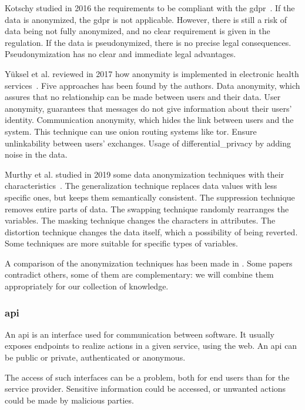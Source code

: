 Kotschy studied in 2016 the requirements to be compliant with the \gls{gdpr}~\cite{kotschy_new_2016}. If the data is anonymized, the \gls{gdpr} is not applicable. However, there is still a risk of data being not fully anonymized, and no clear requirement is given in the regulation. If the data is pseudonymized, there is no precise legal consequences. Pseudonymization has no clear and immediate legal advantages. %

Yüksel et al. reviewed in 2017 how anonymity is implemented in electronic health services~\cite{yuksel_research_2017}. Five approaches has been found by the authors. Data anonymity, which assures that no relationship can be made between users and their data. User anonymity, guarantees that messages do not give information about their users' identity. Communication anonymity, which hides the link between users and the system. This technique can use onion routing systems like \gls{tor}. Ensure unlinkability between users' exchanges. Usage of \gls{differential_privacy} by adding noise in the data. %

Murthy et al. studied in 2019 some data anonymization techniques with their characteristics~\cite{murthy_comparative_2019}. The generalization technique replaces data values with less specific ones, but keeps them semantically consistent. The suppression technique removes entire parts of data. The swapping technique randomly rearranges the variables. The masking technique changes the characters in attributes. The distortion technique changes the data itself, which a possibility of being reverted. Some techniques are more suitable for specific types of variables. %

A comparison of the anonymization techniques has been made in . Some papers contradict others, some of them are complementary: we will combine them appropriately for our collection of knowledge.

\subsubsection{\acrlong*{api}}
\label{subsubsec:state_review_results_api}

An \gls{api} is an interface used for communication between software. It usually exposes endpoints to realize actions in a given service, using the web. An \gls{api} can be public or private, authenticated or anonymous.

The access of such interfaces can be a problem, both for end users than for the service provider. Sensitive information could be accessed, or unwanted actions could be made by malicious parties.


